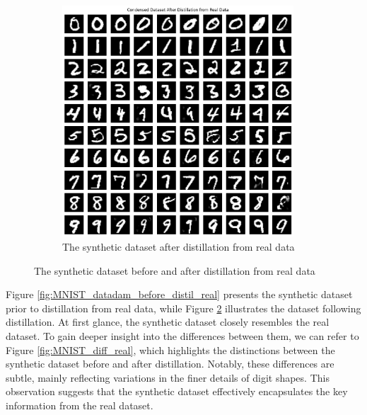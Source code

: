\documentclass[onecolumn]{IEEEtran}
\begin{document}
\begin{figure}[H]
\begin{subfigure}{.5\textwidth}
        \includegraphics[width=0.95\textwidth]{images/MNIST_datadam_after_distil_real.png}
        \caption{The synthetic dataset after distillation from real data}
        \label{fig:MNIST_datadam_after_distil_real}
    \end{subfigure}
    \caption{The synthetic dataset before and after distillation from real data}
\end{figure}


Figure \ref{fig:MNIST_datadam_before_distil_real} presents the synthetic dataset prior to distillation from real data, while Figure \ref{fig:MNIST_datadam_after_distil_real} illustrates the dataset following distillation. At first glance, the synthetic dataset closely resembles the real dataset. To gain deeper insight into the differences between them, we can refer to Figure \ref{fig:MNIST_diff_real}, which highlights the distinctions between the synthetic dataset before and after distillation. Notably, these differences are subtle, mainly reflecting variations in the finer details of digit shapes. This observation suggests that the synthetic dataset effectively encapsulates the key information from the real dataset.
\end{document}
